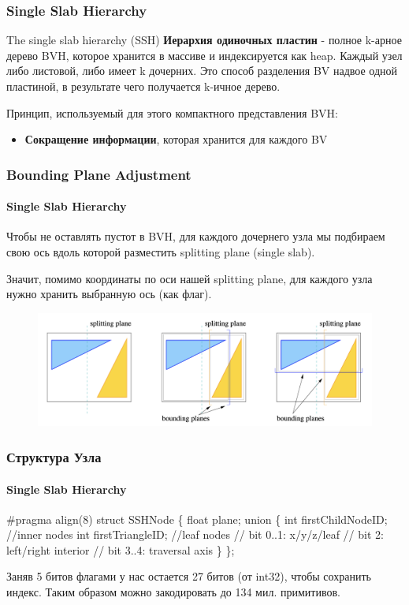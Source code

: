 \begin{frame}
    \frametitle{Single Slab Hierarchy}
    \begin{block}{The single slab hierarchy (SSH)}
        \textbf{Иерархия одиночных пластин} - полное k-арное дерево BVH, которое хранится в массиве
        и индексируется как heap.
        Каждый узел либо листовой, либо имеет k дочерних.
        Это способ разделения BV надвое одной пластиной,
        в результате чего получается k-ичное дерево.
    \end{block}

    Принцип, используемый для этого компактного представления BVH:
    \begin{itemize}
        \item
            \textbf{Сокращение информации}, которая хранится для каждого BV
    \end{itemize}

\end{frame}

\begin{frame}
    \frametitle{Bounding Plane Adjustment}
    \framesubtitle{Single Slab Hierarchy}
    Чтобы не оставлять пустот в BVH, для каждого дочернего узла мы подбираем
    свою ось вдоль которой разместить splitting plane (single slab).

    Значит, помимо координаты по оси нашей splitting plane, для каждого узла нужно
    хранить выбранную ось (как флаг).
    \begin{figure}
        \includegraphics[keepaspectratio, width=\textwidth]{res/splitting_ssh.png}
    \end{figure}
\end{frame}

\begin{frame}[fragile]
    \frametitle{Структура Узла}
    \framesubtitle{Single Slab Hierarchy}

    \begin{semiverbatim}
        #pragma align(8)
        struct SSHNode \{
            float plane;
            union \{
                int firstChildNodeID; //inner nodes
                int firstTriangleID; //leaf nodes
                // bit 0..1: x/y/z/leaf
                // bit 2: left/right interior
                // bit 3..4: traversal axis
            \}
        \};
    \end{semiverbatim}
    Заняв 5 битов флагами у нас остается 27 битов (от int32),
    чтобы сохранить индекс.
    Таким образом можно закодировать до 134 мил. примитивов.

\end{frame}

